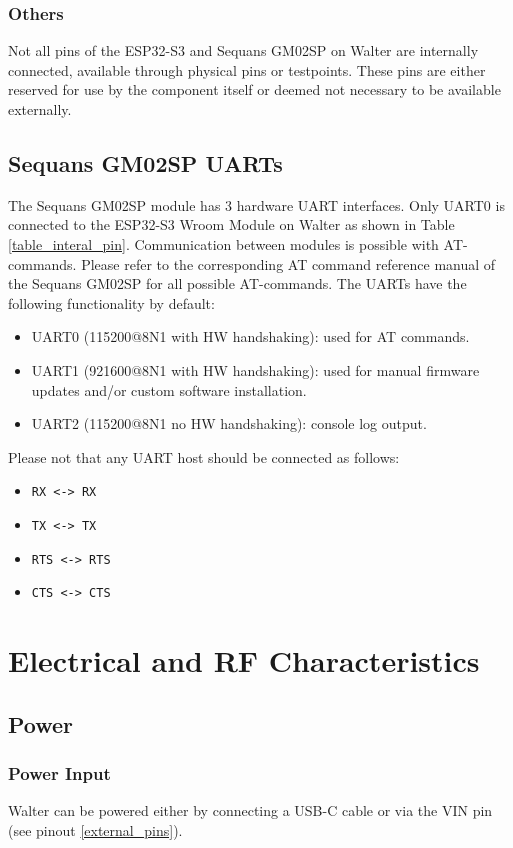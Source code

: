 \documentclass[11pt]{article}
\begin{document}
\subsubsection{Others}
Not all pins of the ESP32-S3 and Sequans GM02SP on Walter are internally connected, available through physical pins or testpoints. These pins are either reserved for use by the component itself or deemed not necessary to be available externally.

\subsection{Sequans GM02SP UARTs} \label{lte_uart}
The Sequans GM02SP module has 3 hardware UART interfaces. Only UART0 is connected to the ESP32-S3 Wroom Module on Walter as shown in Table \ref{table_interal_pin}. Communication between modules is possible with AT-commands. Please refer to the corresponding AT command reference manual of the Sequans GM02SP for all possible AT-commands. The UARTs have the following functionality by default:
\begin{itemize}
	\item UART0 (115200@8N1 with HW handshaking): used for AT commands.
	\item UART1 (921600@8N1 with HW handshaking): used for manual firmware updates and/or custom software installation.
	\item UART2 (115200@8N1 no HW handshaking): console log output.
\end{itemize}

Please not that any UART host should be connected as follows:
\begin{itemize}
	\item \verb+RX <-> RX+
	\item \verb+TX <-> TX+
	\item \verb+RTS <-> RTS+
	\item \verb+CTS <-> CTS+
\end{itemize}
\section{Electrical and RF Characteristics} \label{power_rf_characteristics}
\subsection{Power} \label{power}
\subsubsection{Power Input}
Walter can be powered either by connecting a USB-C cable or via the VIN pin (see pinout \ref{external_pins}).\\
\end{document}
